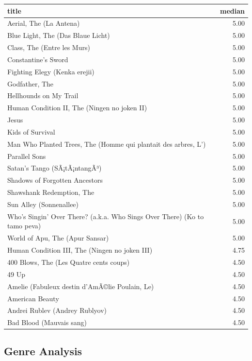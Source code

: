 \documentclass[]{article}
\begin{document}
\begin{table}[H]
\centering\begingroup\fontsize{10}{12}\selectfont

\begin{tabular}{l|r}
\hline
title & median\\
\hline
Aerial, The (La Antena) & 5.00\\
\hline
Blue Light, The (Das Blaue Licht) & 5.00\\
\hline
Class, The (Entre les Murs) & 5.00\\
\hline
Constantine's Sword & 5.00\\
\hline
Fighting Elegy (Kenka erejii) & 5.00\\
\hline
Godfather, The & 5.00\\
\hline
Hellhounds on My Trail & 5.00\\
\hline
Human Condition II, The (Ningen no joken II) & 5.00\\
\hline
Jesus & 5.00\\
\hline
Kids of Survival & 5.00\\
\hline
Man Who Planted Trees, The (Homme qui plantait des arbres, L') & 5.00\\
\hline
Parallel Sons & 5.00\\
\hline
Satan's Tango (SÃ¡tÃ¡ntangÃ³) & 5.00\\
\hline
Shadows of Forgotten Ancestors & 5.00\\
\hline
Shawshank Redemption, The & 5.00\\
\hline
Sun Alley (Sonnenallee) & 5.00\\
\hline
Who's Singin' Over There? (a.k.a. Who Sings Over There) (Ko to tamo peva) & 5.00\\
\hline
World of Apu, The (Apur Sansar) & 5.00\\
\hline
Human Condition III, The (Ningen no joken III) & 4.75\\
\hline
400 Blows, The (Les Quatre cents coups) & 4.50\\
\hline
49 Up & 4.50\\
\hline
Amelie (Fabuleux destin d'AmÃ©lie Poulain, Le) & 4.50\\
\hline
American Beauty & 4.50\\
\hline
Andrei Rublev (Andrey Rublyov) & 4.50\\
\hline
Bad Blood (Mauvais sang) & 4.50\\
\hline
\end{tabular}
\endgroup{}
\end{table}

\hypertarget{genre-analysis}{%
\subsection{Genre Analysis}\label{genre-analysis}}
\end{document}
